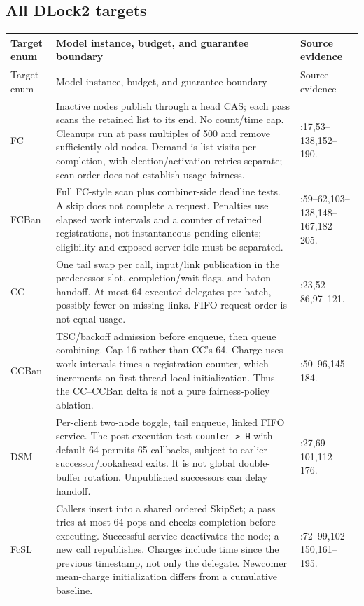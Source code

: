 \subsection{All DLock2 targets}
\small
\begin{longtable}{@{}P{0.14\textwidth}P{0.51\textwidth}P{0.27\textwidth}@{}}
\toprule
Target enum & Model instance, budget, and guarantee boundary & Source evidence \\
\midrule
\endfirsthead
\toprule Target enum & Model instance, budget, and guarantee boundary & Source evidence \\
\midrule
\endhead
\bottomrule
\endfoot
FC & Inactive nodes publish through a head CAS; each pass scans the retained list to its end. No count/time cap. Cleanups run at pass multiples of 500 and remove sufficiently old nodes. Demand is list visits per completion, with election/activation retries separate; scan order does not establish usage fairness. & :17,53--138,152--190. \\
\addlinespace
FCBan & Full FC-style scan plus combiner-side deadline tests. A skip does not complete a request. Penalties use elapsed work intervals and a counter of retained registrations, not instantaneous pending clients; eligibility and exposed server idle must be separated. & :59--62,103--138,148--167,182--205. \\
\addlinespace
CC & One tail swap per call, input/link publication in the predecessor slot, completion/wait flags, and baton handoff. At most 64 executed delegates per batch, possibly fewer on missing links. FIFO request order is not equal usage. & :23,52--86,97--121. \\
\addlinespace
CCBan & TSC/backoff admission before enqueue, then queue combining. Cap 16 rather than CC's 64. Charge uses work intervals times a registration counter, which increments on first thread-local initialization. Thus the CC--CCBan delta is not a pure fairness-policy ablation. & :50--96,145--184. \\
\addlinespace
DSM & Per-client two-node toggle, tail enqueue, linked FIFO service. The post-execution test \texttt{counter > H} with default 64 permits 65 callbacks, subject to earlier successor/lookahead exits. It is not global double-buffer rotation. Unpublished successors can delay handoff. & :27,69--101,112--176. \\
\addlinespace
FcSL & Callers insert into a shared ordered SkipSet; a pass tries at most 64 pops and checks completion before executing. Successful service deactivates the node; a new call republishes. Charges include time since the previous timestamp, not only the delegate. Newcomer mean-charge initialization differs from a cumulative baseline. & :72--99,102--150,161--195. \\

\end{longtable}
